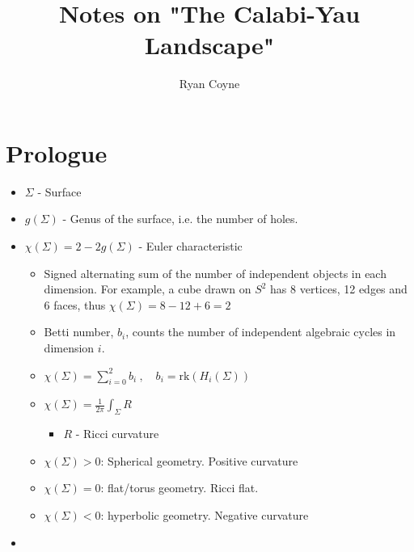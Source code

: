 \documentclass[12pt]{article}
\begin{document}
    \title{Notes on "The Calabi-Yau Landscape"}
    \author{Ryan Coyne}
    \date{}
    \maketitle
    \section{Prologue}
    \begin{itemize}
        \item \(\Sigma\) - Surface
        \item \(g(\Sigma)\) - Genus of the surface, i.e. the number of holes.
        \item \(\chi(\Sigma) = 2 - 2g(\Sigma)\) - Euler characteristic
        \begin{itemize}
            \item Signed alternating sum of the number of independent objects in each dimension. For example, a cube drawn on \(S^2\) has 8 vertices, 12 edges and 6 faces, thus \(\chi(\Sigma) = 8 - 12 + 6 = 2\)
            \item Betti number, \(b_i\), counts the number of independent algebraic cycles in dimension \(i\).
            \item \(\chi(\Sigma) = \sum_{i=0}^2b_i\ ,\quad b_i = \mathrm{rk}(H_i(\Sigma))\)
            \item \(\chi(\Sigma) = \frac{1}{2\pi}\int_\Sigma R\)
            \begin{itemize}
                \item \(R\) - Ricci curvature
            \end{itemize}
            \item \(\chi(\Sigma) > 0\): Spherical geometry. Positive curvature
            \item \(\chi(\Sigma) = 0\): flat/torus geometry. Ricci flat.
            \item \(\chi(\Sigma) < 0\): hyperbolic geometry. Negative curvature
        \end{itemize}
        \item 
    \end{itemize}
\end{document}
